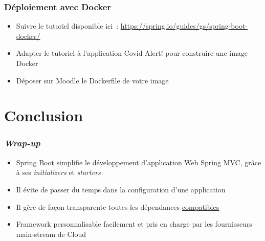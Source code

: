 \documentclass{beamer}
\begin{document}
\begin{frame}
	\frametitle{Déploiement avec Docker}
\begin{itemize}
	\item Suivre le tutoriel disponible ici~:
	\url{https://spring.io/guides/gs/spring-boot-docker/}
	\item Adapter le tutoriel à l'application Covid Alert! pour construire une image Docker
	\item Déposer sur Moodle le Dockerfile de votre image
\end{itemize}
\end{frame} 

%

\section{Conclusion}
\begin{frame}
	\frametitle{\textit{Wrap-up}}
	\begin{itemize}
		\item Spring Boot simplifie le développement d'application Web Spring MVC, grâce à ses \textit{initializers} et \textit{starters}
		\item Il évite de passer du temps dans la configuration d'une application
		\item Il gère de façon transparente toutes les dépendances \underline{compatibles}		
		\item Framework personnalisable facilement et pris en charge par les fournisseurs main-stream de Cloud
	\end{itemize}
\end{frame} 
\end{document}
